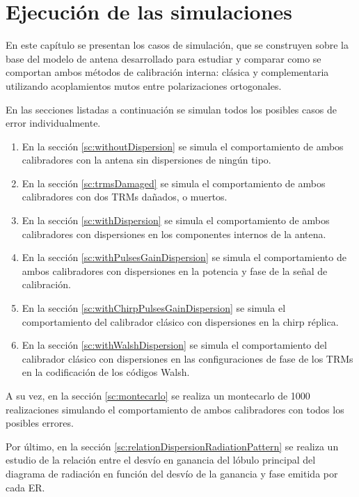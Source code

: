 \chapter{Ejecución de las simulaciones}
\label{ch:simulations}

En este capítulo se presentan los casos de simulación, que se construyen sobre la base del modelo de antena desarrollado para
estudiar y comparar como se comportan ambos métodos de calibración interna: clásica y complementaria utilizando acoplamientos
mutos entre polarizaciones ortogonales.

En las secciones listadas a continuación se simulan todos los posibles casos de error individualmente.
\begin{enumerate}
	\item En la sección \ref{sc:withoutDispersion} se simula el comportamiento de ambos calibradores con la antena sin
		dispersiones de ningún tipo.
	\item En la sección \ref{sc:trmsDamaged} se simula el comportamiento de ambos calibradores con dos TRMs dañados, o muertos.
	\item En la sección \ref{sc:withDispersion} se simula el comportamiento de ambos calibradores con dispersiones en los
		componentes internos de la antena.
	\item En la sección \ref{sc:withPulsesGainDispersion} se simula el comportamiento de ambos calibradores con dispersiones en
		la potencia y fase de la señal de calibración.
	\item En la sección \ref{sc:withChirpPulsesGainDispersion} se simula el comportamiento del calibrador clásico con 
		dispersiones en la chirp réplica. 
	\item En la sección \ref{sc:withWalshDispersion} se simula el comportamiento del calibrador clásico con dispersiones en las
		configuraciones de fase de los TRMs en la codificación de los códigos Walsh.
\end{enumerate}

A su vez, en la sección \ref{sc:montecarlo} se realiza un montecarlo de 1000 realizaciones simulando el comportamiento de ambos
calibradores con todos los posibles errores. 

Por último, en la sección \ref{sc:relationDispersionRadiationPattern} se realiza un estudio de la relación entre el desvío en
ganancia del lóbulo principal del diagrama de radiación en función del desvío de la ganancia y fase emitida por cada ER.


